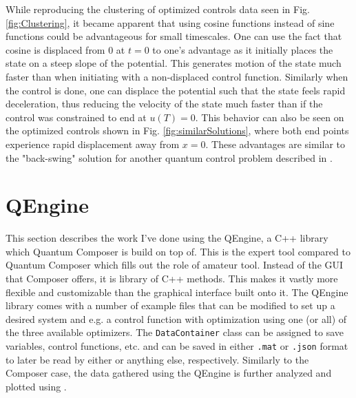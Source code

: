 \documentclass[a4paper, twocolumn]{revtex4-1}
\begin{document}
While reproducing the clustering of optimized controls data seen in Fig. \ref{fig:Clustering}, it became apparent that using cosine functions instead of sine functions could be advantageous for small timescales. One can use the fact that cosine is displaced from 0 at $t=0$ to one's advantage as it initially places the state on a steep slope of the potential. This generates motion of the state much faster than when initiating with a non-displaced control function. Similarly when the control is done, one can displace the potential such that the state feels rapid deceleration, thus reducing the velocity of the state much faster than if the control was constrained to end at $u(T)=0$. This behavior can also be seen on the optimized controls shown in Fig. \ref{fig:similarSolutions}, where both end points experience rapid displacement away from $x=0$. These advantages are similar to the "back-swing" solution for another quantum control problem described in \cite{QM2Paper}.

\section{QEngine}\label{sec:QEngine}
This section describes the work I've done using the QEngine, a C++ library which Quantum Composer is build on top of. This is the expert tool compared to Quantum Composer which fills out the role of amateur tool. Instead of the GUI that Composer offers, it is library of C++ methods. This makes it vastly more flexible and customizable than the graphical interface built onto it. The QEngine library comes with a number of example files that can be modified to set up a desired system and e.g. a control function with optimization using one (or all) of the three available optimizers. The \texttt{DataContainer} class can be assigned to save variables, control functions, etc. and can be saved in either \texttt{.mat} or \texttt{.json} format to later be read by either  or anything else, respectively. Similarly to the Composer case, the data gathered using the QEngine is further analyzed and plotted using . \\
\end{document}
